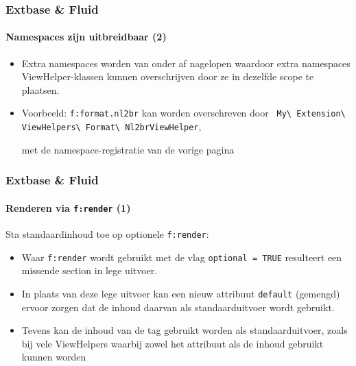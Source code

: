 
\begin{frame}[fragile]
	\frametitle{Extbase \& Fluid}
	\framesubtitle{Namespaces zijn uitbreidbaar (2)}

	\begin{itemize}

		\item Extra namespaces worden van onder af nagelopen waardoor extra namespaces ViewHelper-klassen
			kunnen overschrijven door ze in dezelfde scope te plaatsen.

		\item Voorbeeld: \texttt{f:format.nl2br} kan worden overschreven door
			\texttt{
				My\textbackslash
				Extension\textbackslash
				ViewHelpers\textbackslash
				Format\textbackslash
				Nl2brViewHelper},

				met de namespace-registratie van de vorige pagina

	\end{itemize}

\end{frame}


\begin{frame}[fragile]
	\frametitle{Extbase \& Fluid}
	\framesubtitle{Renderen via \texttt{f:render} (1)}

	Sta standaardinhoud toe op optionele \texttt{f:render}:

	\begin{itemize}

		\item Waar \texttt{f:render} wordt gebruikt met de vlag \texttt{optional = TRUE}
			resulteert een missende section in lege uitvoer.

		\item In plaats van deze lege uitvoer kan een nieuw attribuut \texttt{default}
			(gemengd) ervoor zorgen dat de inhoud daarvan als standaarduitvoer wordt gebruikt.

		\item Tevens kan de inhoud van de tag gebruikt worden als standaarduitvoer, zoals bij vele ViewHelpers
			waarbij zowel het attribuut als de inhoud gebruikt kunnen worden

	\end{itemize}

\end{frame}

